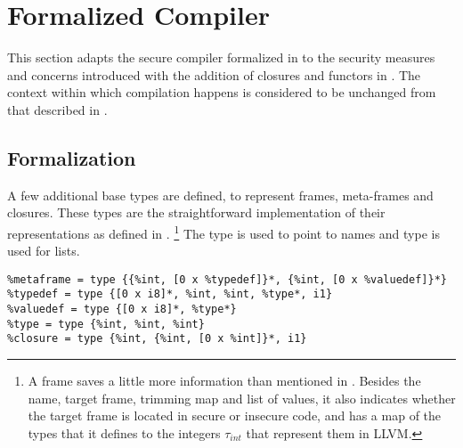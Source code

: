 \section{Formalized Compiler}
\label{sec:formalizedcompiler2}
This section adapts the secure compiler formalized in  to the security measures and concerns introduced with the addition of closures and functors in .
The context within which compilation happens is considered to be unchanged from that described in .

\subsection{Formalization}
A few additional base types are defined, to represent frames, meta-frames and closures. These types are the straightforward implementation of their representations as defined in . 
\footnote{A frame saves a little more information than mentioned in . Besides the name, target frame, trimming map and list of values, it also indicates whether the target frame is located in secure or insecure code, and has a map of the types that it defines to the integers $\tau_{int}$ that represent them in LLVM.}
The type \lsttext{[0 x i8]*} is used to point to names and type  is used for lists.
\begin{lstlisting}[language={[x86masm]Assembler}]
%frame = type {[0 x i8]*, %frame*, i1, {%int, [0 x %int]}*, {%int, [0 x %int (%frame*, i8*)*]}*, {%int, [0 x %int]}*, %metaframe*}
%metaframe = type {{%int, [0 x %typedef]}*, {%int, [0 x %valuedef]}*}
%typedef = type {[0 x i8]*, %int, %int, %type*, i1}
%valuedef = type {[0 x i8]*, %type*}
%type = type {%int, %int, %int}
%closure = type {%int, {%int, [0 x %int]}*, i1}
\end{lstlisting}
